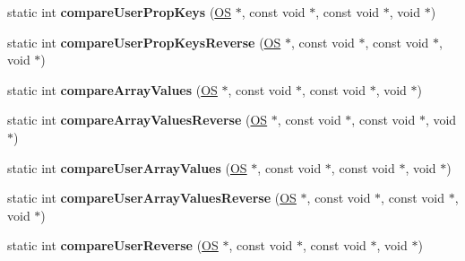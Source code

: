 \begin{DoxyCompactItemize}
\item 
static int {\bfseries compare\+User\+Prop\+Keys} (\hyperlink{class_object_script_1_1_o_s}{OS} $\ast$, const void $\ast$, const void $\ast$, void $\ast$)\hypertarget{class_object_script_1_1_o_s_1_1_core_a8c1e240f688aa076c6dedceba6411c07}{}\label{class_object_script_1_1_o_s_1_1_core_a8c1e240f688aa076c6dedceba6411c07}

\item 
static int {\bfseries compare\+User\+Prop\+Keys\+Reverse} (\hyperlink{class_object_script_1_1_o_s}{OS} $\ast$, const void $\ast$, const void $\ast$, void $\ast$)\hypertarget{class_object_script_1_1_o_s_1_1_core_a24e8475be4fe0f871dadd77d6b552b6b}{}\label{class_object_script_1_1_o_s_1_1_core_a24e8475be4fe0f871dadd77d6b552b6b}

\item 
static int {\bfseries compare\+Array\+Values} (\hyperlink{class_object_script_1_1_o_s}{OS} $\ast$, const void $\ast$, const void $\ast$, void $\ast$)\hypertarget{class_object_script_1_1_o_s_1_1_core_a004160a2e3450db8022524524c71d728}{}\label{class_object_script_1_1_o_s_1_1_core_a004160a2e3450db8022524524c71d728}

\item 
static int {\bfseries compare\+Array\+Values\+Reverse} (\hyperlink{class_object_script_1_1_o_s}{OS} $\ast$, const void $\ast$, const void $\ast$, void $\ast$)\hypertarget{class_object_script_1_1_o_s_1_1_core_ad4e6e93d9a00e572f08f25d5b9c2f41e}{}\label{class_object_script_1_1_o_s_1_1_core_ad4e6e93d9a00e572f08f25d5b9c2f41e}

\item 
static int {\bfseries compare\+User\+Array\+Values} (\hyperlink{class_object_script_1_1_o_s}{OS} $\ast$, const void $\ast$, const void $\ast$, void $\ast$)\hypertarget{class_object_script_1_1_o_s_1_1_core_ac984f61182a7e620d1d795adb1154d4b}{}\label{class_object_script_1_1_o_s_1_1_core_ac984f61182a7e620d1d795adb1154d4b}

\item 
static int {\bfseries compare\+User\+Array\+Values\+Reverse} (\hyperlink{class_object_script_1_1_o_s}{OS} $\ast$, const void $\ast$, const void $\ast$, void $\ast$)\hypertarget{class_object_script_1_1_o_s_1_1_core_a3f5afe6153bc005d0c923da56b108f72}{}\label{class_object_script_1_1_o_s_1_1_core_a3f5afe6153bc005d0c923da56b108f72}

\item 
static int {\bfseries compare\+User\+Reverse} (\hyperlink{class_object_script_1_1_o_s}{OS} $\ast$, const void $\ast$, const void $\ast$, void $\ast$)\hypertarget{class_object_script_1_1_o_s_1_1_core_ab1a6816f2a45414e7ea1599700644961}{}\label{class_object_script_1_1_o_s_1_1_core_ab1a6816f2a45414e7ea1599700644961}


\end{DoxyCompactItemize}
